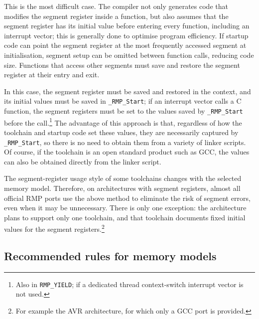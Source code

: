 This is the most difficult case.
The compiler not only generates code that modifies the segment register inside a function, but also assumes that the segment register has its initial value before entering every function, including an interrupt vector; this is generally done to optimise program efficiency.
If startup code can point the segment register at the most frequently accessed segment at initialisation, segment setup can be omitted between function calls, reducing code size.
Functions that access other segments must save and restore the segment register at their entry and exit.

In this case, the segment register must be saved and restored in the context, and its initial values must be saved in \texttt{\_RMP\_Start}; if an interrupt vector calls a C function, the segment registers must be set to the values saved by \texttt{\_RMP\_Start} before the call.\footnote{Also in \texttt{RMP\_YIELD}; if a dedicated thread context-switch interrupt vector is not used.}
The advantage of this approach is that, regardless of how the toolchain and startup code set these values, they are necessarily captured by \texttt{\_RMP\_Start}, so there is no need to obtain them from a variety of linker scripts.
Of course, if the toolchain is an open standard product such as GCC, the values can also be obtained directly from the linker script.

The segment-register usage style of some toolchains changes with the selected memory model.
Therefore, on architectures with segment registers, almost all official RMP ports use the above method to eliminate the risk of segment errors, even when it may be unnecessary.
There is only one exception: the architecture plans to support only one toolchain, and that toolchain documents fixed initial values for the segment registers.\footnote{For example the AVR architecture, for which only a GCC port is provided.}

\subsection{Recommended rules for memory models}

